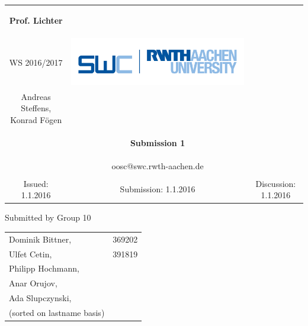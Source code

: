 \documentclass[a4paper,12pt,oneside]{scrreprt}
\begin{document}
	
\begin{tabular}{ccc}
	\begin{large} \textbf{Prof. Lichter} \end{large} &
	
	\begin{minipage}[H]{3.5cm}
	\centering
		\begin{large} OOSC \end{large} \\
		\begin{large} WS 2016/2017 \end{large}
	\end{minipage} &
	
	\begin{minipage}[H]{4cm}
		\includegraphics[keepaspectratio,width=\textwidth,angle=0]{images/swc.png}
	\end{minipage} \\
Andreas Steffens, Konrad F\"ogen &  &  \\
& \begin{huge} \textbf{Submission 1} \end{huge}&  \\
& oosc@swc.rwth-aachen.de &  \\
& & \\
Issued: 1.1.2016 &
Submission: 1.1.2016 &
Discussion: 1.1.2016 \\
\end{tabular}
\newline \newline \newline
\centering
Submitted by Group 10

\begin{tabular}{ll}
	Dominik Bittner, & 369202 \\
	Ulfet Cetin, & 391819\\
 	Philipp Hochmann,\\
 	Anar Orujov,\\
 	Ada Slupczynski, \\
 	(sorted on lastname basis)
\end{tabular}
\end{document}
